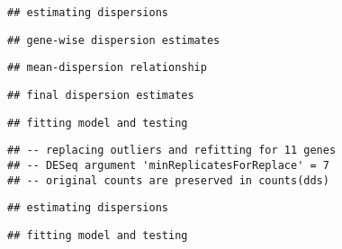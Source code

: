 \documentclass[
  oneside]{book}
\newenvironment{Shaded}{\begin{snugshade}}{\end{snugshade}}
\newcommand{\AttributeTok}[1]{\textcolor[rgb]{0.77,0.63,0.00}{#1}}
\newcommand{\CommentTok}[1]{\textcolor[rgb]{0.56,0.35,0.01}{\textit{#1}}}
\newcommand{\FunctionTok}[1]{\textcolor[rgb]{0.00,0.00,0.00}{#1}}
\newcommand{\NormalTok}[1]{#1}
\newcommand{\OtherTok}[1]{\textcolor[rgb]{0.56,0.35,0.01}{#1}}
\newcommand{\SpecialCharTok}[1]{\textcolor[rgb]{0.00,0.00,0.00}{#1}}
\newcommand{\StringTok}[1]{\textcolor[rgb]{0.31,0.60,0.02}{#1}}
\begin{document}
\begin{verbatim}
## estimating dispersions
\end{verbatim}

\begin{verbatim}
## gene-wise dispersion estimates
\end{verbatim}

\begin{verbatim}
## mean-dispersion relationship
\end{verbatim}

\begin{verbatim}
## final dispersion estimates
\end{verbatim}

\begin{verbatim}
## fitting model and testing
\end{verbatim}

\begin{verbatim}
## -- replacing outliers and refitting for 11 genes
## -- DESeq argument 'minReplicatesForReplace' = 7 
## -- original counts are preserved in counts(dds)
\end{verbatim}

\begin{verbatim}
## estimating dispersions
\end{verbatim}

\begin{verbatim}
## fitting model and testing
\end{verbatim}

\begin{Shaded}
\end{Shaded}
\end{document}
